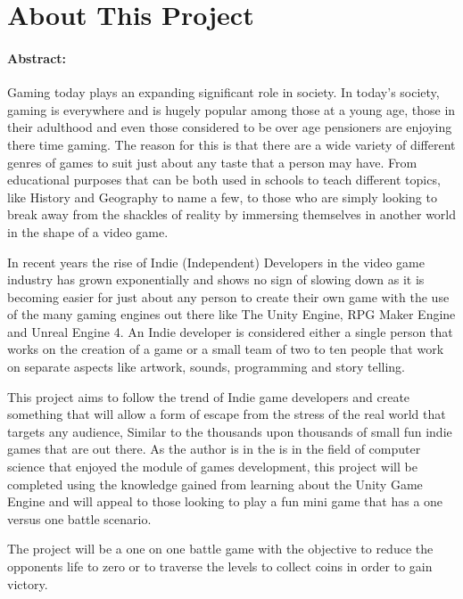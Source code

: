 

\section*{About This Project}

\paragraph {Abstract:} Gaming today plays an expanding signiﬁcant role in society. In today's society, gaming is everywhere and is hugely popular among those at a young age, those in their adulthood and even those considered to be over age pensioners are enjoying there time gaming. The reason for this is that there are a wide variety of different genres of games to suit just about any taste that a person may have. From educational purposes that can be both used in schools to teach different topics, like History and Geography to name a few, to those who are simply looking to break away from the shackles of reality by immersing themselves in another world in the shape of a video game. \par
 In recent years the rise of Indie (Independent) Developers in the video game industry has grown exponentially and shows no sign of slowing down as it is becoming easier for just about any person to create their own game with the use of the many gaming engines out there like The Unity Engine, RPG Maker Engine and Unreal Engine 4. An Indie developer is considered either a single person that works on the creation of a game or a small team of two to ten people that work on separate aspects like artwork, sounds, programming and story telling. \par
This project aims to follow the trend of Indie game developers and create something that will allow a form of escape from the stress of the real world that targets any audience, Similar to the thousands upon thousands of small fun indie games that are out there. As the author is in the is in the field of computer science that enjoyed the module of games development, this project will be completed using the knowledge gained from learning about the Unity Game Engine and will appeal to those looking to play a fun mini game that has a one versus one battle scenario. \par 
The project will be a one on one battle game with the objective to reduce the opponents life to zero or to traverse the levels to collect coins in order to gain victory.\par \bigskip

